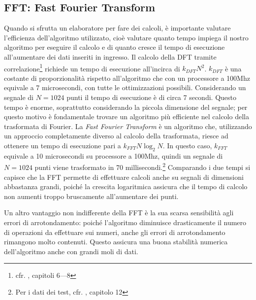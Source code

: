 \subsection{FFT: Fast Fourier Transform}
\label{fft}
Quando si sfrutta un elaboratore per fare dei calcoli, \`e importante valutare
l'efficienza dell'algoritmo utilizzato, cio\`e valutare quanto tempo impiega il
nostro algoritmo per eseguire il calcolo e di quanto cresce il tempo di
esecuzione all'aumentare dei dati inseriti in ingresso. Il calcolo della DFT
tramite correlazione\footnote{cfr. \cite{TSEGDSP97}, capitoli 6---8} richiede un
tempo di esecuzione all'incirca di $k_{DFT}N^2$. $k_{DFT}$  \`e una costante di
proporzionalit\`a rispetto all'algoritmo che con un processore a 100Mhz
equivale a 7 microsecondi, con tutte le ottimizzazioni possibili. Considerando un segnale
di $N = 1024$ punti il tempo di esecuzione \`e di circa 7 secondi. Questo tempo
\`e enorme, soprattutto considerando la piccola dimensione del segnale; per
questo motivo \`e fondamentale trovare un algoritmo pi\`u efficiente nel calcolo
della trasformata di Fourier. La \emph{Fast Fourier Transform} \`e un algoritmo
che, utilizzando un approccio completamente diverso al calcolo della
trasformata, riesce ad ottenere un tempo di esecuzione pari a
$k_{FFT}N\log_{2}N$. In questo caso, $k_{FFT}$ equivale a 10 microsecondi su
processore a 100Mhz, quindi un segnale di $N=1024$ punti viene trasformato in 70
millisecondi.\footnote{Per i dati dei test, cfr. \cite{TSEGDSP97}, capitolo 12}
Comparando i due tempi si capisce che la FFT permette di effettuare calcoli
anche su segnali di dimensioni abbastanza grandi, poich\'e la crescita
logaritmica assicura che il tempo di calcolo non aumenti troppo bruscamente
all'aumentare dei punti.

Un altro vantaggio non indifferente della \ac{FFT} \`e la sua scarsa sensibilit\`a
agli errori di arrotondamento: poich\'e l'algoritmo diminuisce drasticamente il
numero di operazioni da effettuare sui numeri, anche gli errori di
arrotondamento rimangono molto contenuti. Questo assicura una buona stabilit\`a
numerica dell'algoritmo anche con grandi moli di dati.
